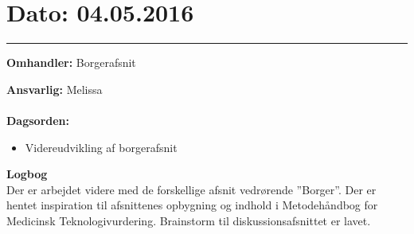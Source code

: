 

\section{Dato: 04.05.2016}
\hrule

\textbf{Omhandler:} Borgerafsnit

\textbf{Ansvarlig:} Melissa \\ \\
\textbf{Dagsorden:}
\begin{itemize}
	\item Videreudvikling af borgerafsnit
\end{itemize}

\textbf{Logbog}
\\
Der er arbejdet videre med de forskellige afsnit vedrørende ”Borger”. Der er hentet inspiration til afsnittenes opbygning og indhold i Metodehåndbog for Medicinsk Teknologivurdering. Brainstorm til diskussionsafsnittet er lavet. 
\\ \\



